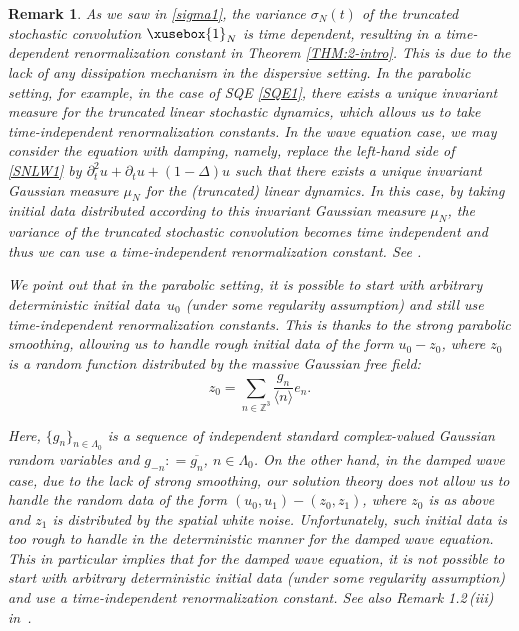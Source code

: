 \documentclass[%
11pt,  reqno]{amsart}
\def\<#1>{\xusebox{#1}}
\newtheorem{remark}[theorem]{Remark}
\newcommand{\1}{\hspace{0.2mm}\text{I}\hspace{0.2mm}}
\newcommand{\noi}{\noindent}
\newcommand{\Z}{\mathbb{Z}}
\newcommand{\Dl}{\Delta}
\newcommand{\Ld}{\Lambda}
\newcommand{\s}{\sigma}
\newcommand{\cj}{\overline}
\newcommand{\dt}{\partial_t}
\newcommand{\jb}[1]
{\langle #1 \rangle}
\numberwithin{equation}{section}
\numberwithin{theorem}{section}
\begin{document}
\begin{remark}\rm
As we saw in \eqref{sigma1}, the variance $\s_N(t)$ of the truncated stochastic convolution
$\<1>_N $ is time dependent, 
resulting in a time-dependent renormalization constant
in Theorem \ref{THM:2-intro}.
This is due to the lack of any dissipation mechanism in the dispersive setting.
In the parabolic setting, for example, in the case of SQE \eqref{SQE1}, 
there exists a unique invariant measure 
for the truncated linear stochastic dynamics, 
which allows us to take time-independent renormalization constants.
In the wave equation case, 
we may consider the equation with damping,
namely, replace the left-hand side of
\eqref{SNLW1} by $\dt^2 u  + \dt u + (1 -  \Dl)  u$
such that there exists a unique invariant Gaussian measure $\mu_N$ for the (truncated) linear dynamics.
In this case, 
by taking initial data  distributed according to this invariant Gaussian measure $\mu_N$,
the variance of the truncated stochastic convolution
becomes time independent
and thus we can use a time-independent renormalization constant.
See \cite{GKOT, ORTz, OOR, ORW}.

We point out that
in the parabolic setting, it is possible to start with arbitrary deterministic initial data~$u_0$
(under some regularity assumption)
and still use time-independent renormalization constants.
This is thanks to the 
 strong parabolic smoothing, 
  allowing us to handle rough initial data of the form 
  $u_0  - z_0$, 
  where $z_0$
  is a random function distributed by the massive Gaussian free field:
 \[ z_0 = \sum_{n \in \Z^3} \frac{g_n}{\jb{n}}e_n.\]
 
 \noi
 Here, $\{g_n\}_{n \in \Ld_0}$ is a sequence of independent
 standard complex-valued Gaussian random variables 
 and $g_{-n}: = \cj{g_n}$, $n \in \Ld_0$.
 On the other hand, in the damped  wave case, 
due to the lack of strong smoothing, 
our solution theory does not allow us to 
 handle the random data 
 of the form $(u_0, u_1) - (z_0, z_1)$, 
 where $z_0$ is as above and $z_1$ is distributed by the spatial white noise.
Unfortunately, such initial data is too rough to handle in the deterministic manner
for the damped wave equation.
 This in particular implies that 
for the damped wave equation, 
it is not possible to start with 
 arbitrary deterministic initial data
(under some regularity assumption)
and  use a time-independent renormalization constant.
See also Remark 1.2\,(iii) in~\cite{OOR}.

\end{remark}
\end{document}
